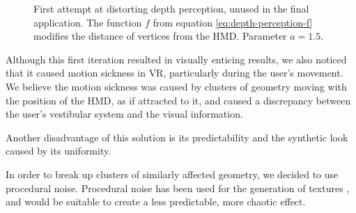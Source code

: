 \begin{figure}[H]
{            
        }
    \fi
    \caption{First attempt at distorting depth perception, unused in the final application. The function $f$ from equation \ref{eq:depth-perception-f} modifies the distance of vertices from the \ac{HMD}. Parameter $a = 1.5$.}\label{fig:depth-perception-f}
\end{figure}

Although this first iteration resulted in visually enticing results, we also noticed that it caused motion sickness in \ac{VR}, particularly during the user's movement. We believe the motion sickness was caused by clusters of geometry moving with the position of the \ac{HMD}, as if attracted to it, and caused a discrepancy between the user's vestibular system and the visual information.

Another disadvantage of this solution is its predictability and the synthetic look caused by its uniformity.

In order to break up clusters of similarly affected geometry, we decided to use procedural noise. Procedural noise has been used for the generation of textures \autocite{perlin1985image}, and would be suitable to create a less predictable, more chaotic effect.

